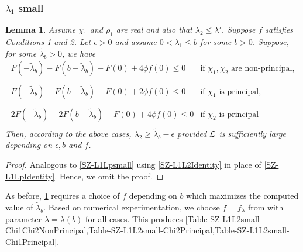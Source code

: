 \documentclass[12pt,psamsfonts]{amsart}
\newtheorem{lem}[thm]{Lemma}
\theoremstyle{definition}
\theoremstyle{remark}
\numberwithin{equation}{section}
\begin{document}
\subsubsection{$\lambda_1$ small} 
\begin{lem} \label{SZ-L1L2small} Assume $\chi_1$ and $\rho_1$ are real and also that $\lambda_2 \leq \lambda'$. Suppose $f$ satisfies Conditions 1 and 2.  Let $\epsilon > 0$ and assume $0 <  \lambda_1 \leq b$ for some $b > 0$. Suppose, for some $\tilde{\lambda}_b > 0$, we have 
\[
\begin{array}{ll}
 F(-\tilde{\lambda}_b) - F(b-\tilde{\lambda}_b) - F(0) +   4\phi f(0)   \leq 0 & \text{if $\chi_1, \chi_2$ are non-principal,} \\\\
 F(-\tilde{\lambda}_b) - F(b-\tilde{\lambda}_b) - F(0) +   2\phi f(0)   \leq 0 & \text{if $\chi_1$ is principal,} \\\\
 2F(-\tilde{\lambda}_b) - 2F(b-\tilde{\lambda}_b) - F(0) +   4\phi f(0)  \leq 0 & \text{if $\chi_2$ is principal} \\
\end{array}
\]
Then, according to the above cases, $\lambda_2 \geq \tilde{\lambda}_b - \epsilon$ provided $\mathcal{L}$ is sufficiently large depending on $\epsilon, b$ and $f$.
\end{lem}
\begin{proof} Analogous to \cref{SZ-L1Lpsmall} using \cref{SZ-L1L2Identity} in place of \cref{SZ-L1LpIdentity}. Hence, we omit the proof.  
\end{proof}

As before,  \cref{SZ-L1L2small} requires a choice of $f$ depending on $b$ which maximizes the computed value of $\tilde{\lambda}_b$. Based on numerical experimentation, we choose $f = f_{\lambda}$ from  \cite[Lemma 7.2]{HBLinnik} with parameter $\lambda = \lambda(b)$ for all cases. This produces \cref{Table-SZ-L1L2small-Chi1Chi2NonPrincipal,Table-SZ-L1L2small-Chi2Principal,Table-SZ-L1L2small-Chi1Principal}.
\end{document}
